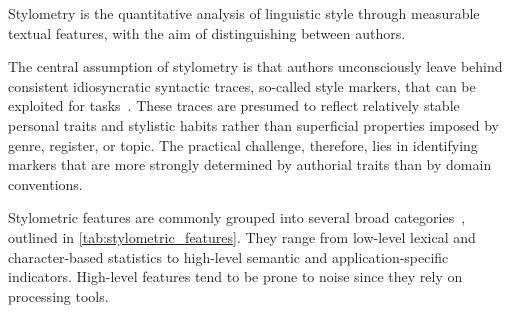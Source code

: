 
\begin{definition}
    [Stylometry]
    Stylometry is the quantitative analysis of linguistic style through measurable textual features, with the aim of distinguishing between authors.
\end{definition}
The central assumption of stylometry is that authors unconsciously leave behind consistent idiosyncratic syntactic traces, so-called style markers, that can be exploited for \ai tasks~\citep{neal_surveying_2018,bischoff_importance_2020}. 
These traces are presumed to reflect relatively stable personal traits and stylistic habits rather than superficial properties imposed by genre, register, or topic. 
The practical challenge, therefore, lies in identifying markers that are more strongly determined by authorial traits than by domain conventions.

Stylometric features are commonly grouped into several broad categories~\citep{stamatatos_survey_2009}, outlined in \autoref{tab:stylometric_features}. 
They range from low-level lexical and character-based statistics to high-level semantic and application-specific indicators.
High-level features tend to be prone to noise since they rely on processing tools.



